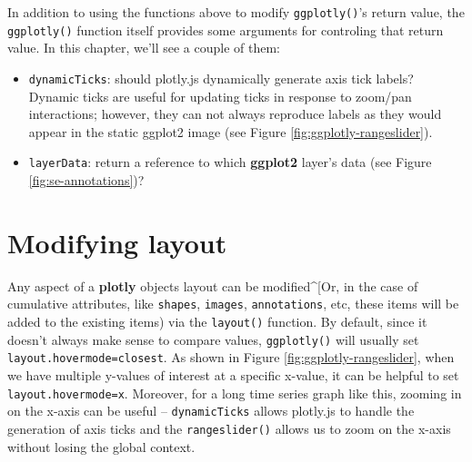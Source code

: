 \documentclass[
  12pt,
]{krantz}
\newenvironment{Shaded}{\begin{snugshade}}{\end{snugshade}}
\newcommand{\DataTypeTok}[1]{\textcolor[rgb]{0.13,0.29,0.53}{#1}}
\newcommand{\KeywordTok}[1]{\textcolor[rgb]{0.13,0.29,0.53}{\textbf{#1}}}
\newcommand{\NormalTok}[1]{#1}
\newcommand{\OperatorTok}[1]{\textcolor[rgb]{0.81,0.36,0.00}{\textbf{#1}}}
\newcommand{\OtherTok}[1]{\textcolor[rgb]{0.56,0.35,0.01}{#1}}
\newcommand{\StringTok}[1]{\textcolor[rgb]{0.31,0.60,0.02}{#1}}
\providecommand{\tightlist}{%
  \setlength{\itemsep}{0pt}\setlength{\parskip}{0pt}}
\begin{document}
In addition to using the functions above to modify \texttt{ggplotly()}'s return value, the \texttt{ggplotly()} function itself provides some arguments for controling that return value. In this chapter, we'll see a couple of them:

\begin{itemize}
\tightlist
\item
  \texttt{dynamicTicks}: should plotly.js dynamically generate axis tick labels? Dynamic ticks are useful for updating ticks in response to zoom/pan interactions; however, they can not always reproduce labels as they would appear in the static ggplot2 image (see Figure \ref{fig:ggplotly-rangeslider}).
\item
  \texttt{layerData}: return a reference to which \textbf{ggplot2} layer's data (see Figure \ref{fig:se-annotations})?
\end{itemize}

\hypertarget{modifying-layout}{%
\section{Modifying layout}\label{modifying-layout}}

Any aspect of a \textbf{plotly} objects layout can be modified\^{}{[}Or, in the case of cumulative attributes, like \texttt{shapes}, \texttt{images}, \texttt{annotations}, etc, these items will be added to the existing items) via the \texttt{layout()} function. By default, since it doesn't always make sense to compare values, \texttt{ggplotly()} will usually set \texttt{layout.hovermode=\textquotesingle{}closest\textquotesingle{}}. As shown in Figure \ref{fig:ggplotly-rangeslider}, when we have multiple y-values of interest at a specific x-value, it can be helpful to set \texttt{layout.hovermode=\textquotesingle{}x\textquotesingle{}}. Moreover, for a long time series graph like this, zooming in on the x-axis can be useful -- \texttt{dynamicTicks} allows plotly.js to handle the generation of axis ticks and the \texttt{rangeslider()} allows us to zoom on the x-axis without losing the global context.

\begin{Shaded}
\end{Shaded}
\end{document}
